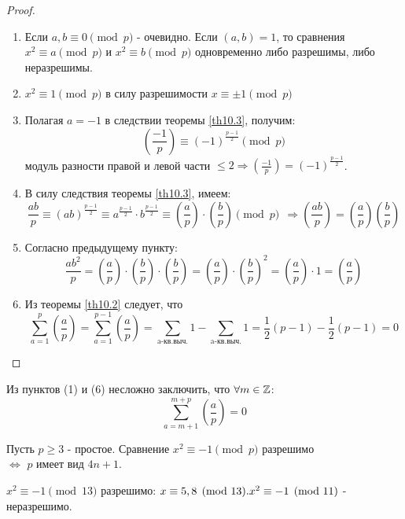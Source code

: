         \begin{proof}\tab
            \begin{enumerate}
                \item Если $a,b\equiv 0\pmod{p}$ - очевидно. Если $(a,b)=1$, то сравнения\\
                $x^2\equiv a\pmod{p}$ и $x^2\equiv b\pmod{p}$ одновременно либо разрешимы, либо неразрешимы.
                \item $x^2\equiv 1\pmod{p}$ в силу разрешимости $x\equiv \pm 1\pmod{p}$
                \item Полагая $a=-1$ в следствии теоремы \ref{th10.3}, получим:
                \[(\frac{-1}{p})\equiv (-1)^{\frac{p-1}{2}}\pmod{p}\]
                модуль разности правой и левой части $\leq 2 \Rightarrow (\frac{-1}{p})=(-1)^{\frac{p-1}{2}}$.
                \item В силу следствия теоремы \ref{th10.3}, имеем:
                \[\frac{ab}{p}\equiv(ab)^{\frac{p-1}{2}}\equiv a^{\frac{p-1}{2}}\cdot b^{\frac{p-1}{2}}\equiv (\frac{a}{p})\cdot(\frac{b}{p})\pmod{p}\ \ \Rightarrow (\frac{ab}{p})=(\frac{a}{p})(\frac{b}{p})\]
                \item Согласно предыдущему пункту:
                \[\frac{ab^2}{p}=(\frac{a}{p})\cdot(\frac{b}{p})\cdot(\frac{b}{p})=(\frac{a}{p})\cdot(\frac{b}{p})^2=(\frac{a}{p})\cdot 1=(\frac{a}{p})\]
                \item Из теоремы \ref{th10.2} следует, что
                \[\sum\limits_{a=1}^{p}(\frac{a}{p})=\sum\limits_{a=1}^{p-1}(\frac{a}{p})=\sum\limits_{\text{a-кв.выч.}}1 - \sum\limits_{\text{a-кв.выч.}}1=\frac{1}{2}(p-1)-\frac{1}{2}(p-1)=0\]
            \end{enumerate}
        \end{proof}
    \begin{comm}
        Из пунктов (1) и (6) несложно заключить, что $\forall m\in\mathbb{Z}$:
        \[\sum\limits_{a=m+1}^{m+p}(\frac{a}{p})=0\]
    \end{comm} 
    \begin{consequense}
        Пусть $p\geq 3$ - простое. Сравнение $x^2\equiv -1\pmod{p}$ разрешимо\\
        $\Leftrightarrow$ $p$ имеет вид $4n+1$.
    \end{consequense} 
    \begin{example}
        $x^2\equiv -1\pmod{13}$ разрешимо: $x\equiv 5,8\pmod{13}.\\
        x^2\equiv -1\pmod{11}$ - неразрешимо.
    \end{example}
